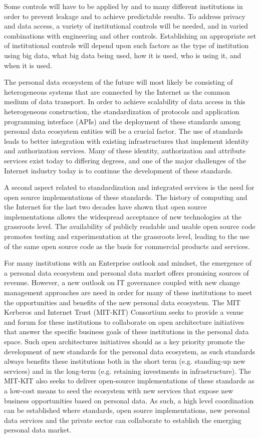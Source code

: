 Some controls will have to be applied by and to many different institutions in order to prevent leakage and to achieve predictable results. To address privacy and data access, a variety of institutional controls will be needed, and in varied combinations with engineering and other controls. Establishing an appropriate set of institutional controls will depend upon such factors as the type of institution using big data, what big data being used, how it is used, who is using it, and when it is used.

The personal data ecosystem of the future will most likely be consisting of heterogeneous systems that are connected by the Internet as the common medium of data transport. In order to achieve scalability of data access in this heterogeneous construction, the standardization of protocols and application programming interface (APIs) and the deployment of these standards among personal data ecosystem entities will be a crucial factor. The use of standards leads to better integration with existing infrastructures that implement identity and authorization services. Many of these identity, authorization and attribute services exist today to differing degrees, and one of the major challenges of the Internet industry today is to continue the development of these standards.

A second aspect related to standardization and integrated services is the need for open source implementations of these standards. The history of computing and the Internet for the last two decades have shown that open source implementations allows the widespread acceptance of new technologies at the grassroots level. The availability of publicly readable and usable open source code promotes testing and experimentation at the grassroots level, leading to the use of the same open source code as the basis for commercial products and services.

For many institutions with an Enterprise outlook and mindset, the emergence of a personal data ecosystem and personal data market offers promising sources of revenue. However, a new outlook on IT governance coupled with new change management approaches are need in order for many of these institutions to meet the opportunities and benefits of the new personal data ecosystem. The MIT Kerberos and Internet Trust (MIT-KIT) Consortium seeks to provide a venue and forum for these institutions to collaborate on open architecture initiatives that answer the specific business goals of these institutions in the personal data space. Such open architectures initiatives should as a key priority promote the development of new standards for the personal data ecosystem, as such standards always benefits these institutions both in the short term (e.g. standing-up new services) and in the long-term (e.g. retaining investments in infrastructure). The MIT-KIT also seeks to deliver open-source implementations of these standards as a low-cost means to seed the ecosystem with new services that expose new business opportunities based on personal data. As such, a high level coordination can be established where standards, open source implementations, new personal data services and the private sector can collaborate to establish the emerging personal data market.

